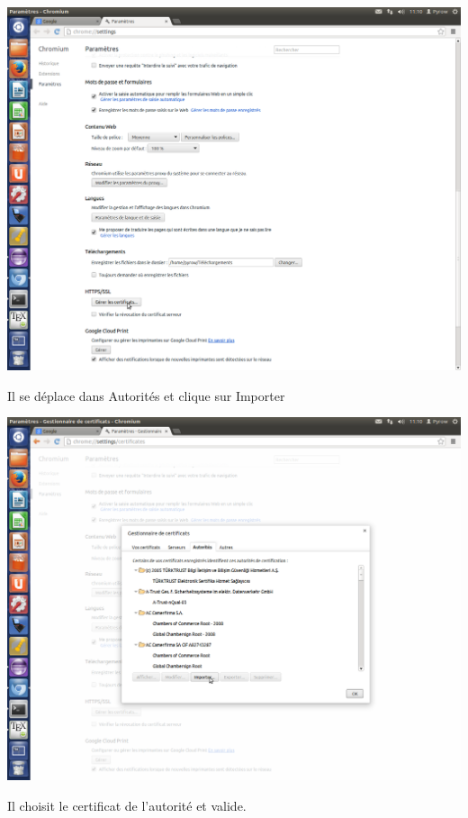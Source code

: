 \documentclass[a4paper,11pt,french]{book}
\begin{document}
\includegraphics[width=\textwidth]{images/ChromeCert.png} 
\newpage

Il se déplace dans Autorités et clique sur Importer

\includegraphics[width=\textwidth]{images/ChromeCA.png} 
\newpage

Il choisit le certificat de l'autorité et valide.
\end{document}
